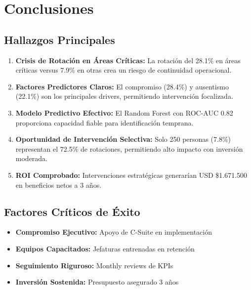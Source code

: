 \documentclass[11pt,a4paper,twoside]{article}
\begin{document}
\newpage

\section{Conclusiones}

\subsection{Hallazgos Principales}

\begin{enumerate}
    \item \textbf{Crisis de Rotación en Áreas Críticas:} La rotación del 28.1\% en áreas críticas versus 7.9\% en otras crea un riesgo de continuidad operacional.
    
    \item \textbf{Factores Predictores Claros:} El compromiso (28.4\%) y ausentismo (22.1\%) son los principales drivers, permitiendo intervención focalizada.
    
    \item \textbf{Modelo Predictivo Efectivo:} El Random Forest con ROC-AUC 0.82 proporciona capacidad fiable para identificación temprana.
    
    \item \textbf{Oportunidad de Intervención Selectiva:} Solo 250 personas (7.8\%) representan el 72.5\% de rotaciones, permitiendo alto impacto con inversión moderada.
    
    \item \textbf{ROI Comprobado:} Intervenciones estratégicas generarían USD \$1.671.500 en beneficios netos a 3 años.
\end{enumerate}

\subsection{Factores Críticos de Éxito}

\begin{itemize}
    \item \textbf{Compromiso Ejecutivo:} Apoyo de C-Suite en implementación
    \item \textbf{Equipos Capacitados:} Jefaturas entrenadas en retención
    \item \textbf{Seguimiento Riguroso:} Monthly reviews de KPIs
    \item \textbf{Inversión Sostenida:} Presupuesto asegurado 3 años
\end{itemize}
\end{document}
